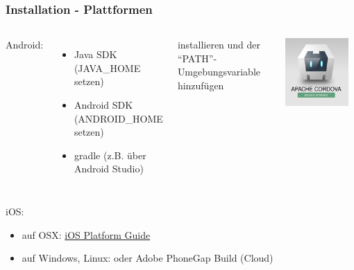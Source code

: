 \documentclass[xcolor=dvipsnames]{beamer}
\begin{document}
\begin{frame}\frametitle{Installation - Plattformen}
	\begin{columns}[t,onlytextwidth]
			Android:
			\begin{itemize}
				\item Java SDK (JAVA\_HOME setzen)
				\item Android SDK (ANDROID\_HOME setzen)
				\item gradle (z.B. über Android Studio)
			\end{itemize}
			installieren und der "`PATH"'-Umgebungsvariable hinzufügen\newline
			
		\centering
		\includegraphics[width=0.9\textwidth,valign=t]{pictures/cordova_device_is_ready}\\
	\end{columns}
	iOS:
	\begin{itemize}
		\item auf OSX: \href{https://cordova.apache.org/docs/en/latest/guide/platforms/ios/index.html}{\textcolor{cordovablue}{iOS Platform Guide}}
		\item auf Windows, Linux: {\LARGE \frownie} oder Adobe PhoneGap Build (Cloud)
	\end{itemize}
\end{frame}
\end{document}
